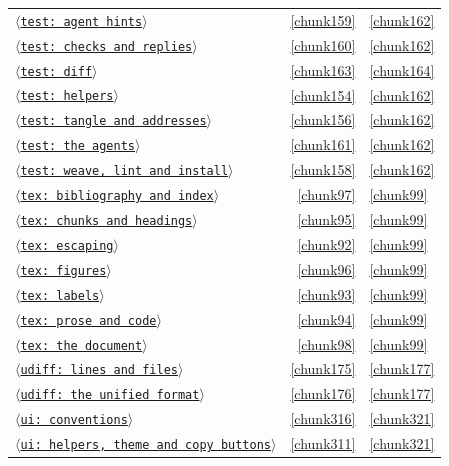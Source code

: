 \documentclass[10pt,a4paper]{article}
\newcounter{chunk}
\newcommand{\chunkname}[1]{\ensuremath{\langle}\texttt{#1}\ensuremath{\rangle}}
\begin{document}
\begin{longtable}{@{}p{}rp{}@{}}
\hyperref[chunk159]{\chunkname{test: agent hints}} & \ref*{chunk159} & \hyperref[chunk162]{\ref*{chunk162}} \\
\hyperref[chunk160]{\chunkname{test: checks and replies}} & \ref*{chunk160} & \hyperref[chunk162]{\ref*{chunk162}} \\
\hyperref[chunk163]{\chunkname{test: diff}} & \ref*{chunk163} & \hyperref[chunk164]{\ref*{chunk164}} \\
\hyperref[chunk154]{\chunkname{test: helpers}} & \ref*{chunk154} & \hyperref[chunk162]{\ref*{chunk162}} \\
\hyperref[chunk156]{\chunkname{test: tangle and addresses}} & \ref*{chunk156} & \hyperref[chunk162]{\ref*{chunk162}} \\
\hyperref[chunk161]{\chunkname{test: the agents}} & \ref*{chunk161} & \hyperref[chunk162]{\ref*{chunk162}} \\
\hyperref[chunk158]{\chunkname{test: weave, lint and install}} & \ref*{chunk158} & \hyperref[chunk162]{\ref*{chunk162}} \\
\hyperref[chunk97]{\chunkname{tex: bibliography and index}} & \ref*{chunk97} & \hyperref[chunk99]{\ref*{chunk99}} \\
\hyperref[chunk95]{\chunkname{tex: chunks and headings}} & \ref*{chunk95} & \hyperref[chunk99]{\ref*{chunk99}} \\
\hyperref[chunk92]{\chunkname{tex: escaping}} & \ref*{chunk92} & \hyperref[chunk99]{\ref*{chunk99}} \\
\hyperref[chunk96]{\chunkname{tex: figures}} & \ref*{chunk96} & \hyperref[chunk99]{\ref*{chunk99}} \\
\hyperref[chunk93]{\chunkname{tex: labels}} & \ref*{chunk93} & \hyperref[chunk99]{\ref*{chunk99}} \\
\hyperref[chunk94]{\chunkname{tex: prose and code}} & \ref*{chunk94} & \hyperref[chunk99]{\ref*{chunk99}} \\
\hyperref[chunk98]{\chunkname{tex: the document}} & \ref*{chunk98} & \hyperref[chunk99]{\ref*{chunk99}} \\
\hyperref[chunk175]{\chunkname{udiff: lines and files}} & \ref*{chunk175} & \hyperref[chunk177]{\ref*{chunk177}} \\
\hyperref[chunk176]{\chunkname{udiff: the unified format}} & \ref*{chunk176} & \hyperref[chunk177]{\ref*{chunk177}} \\
\hyperref[chunk316]{\chunkname{ui: conventions}} & \ref*{chunk316} & \hyperref[chunk321]{\ref*{chunk321}} \\
\hyperref[chunk311]{\chunkname{ui: helpers, theme and copy buttons}} & \ref*{chunk311} & \hyperref[chunk321]{\ref*{chunk321}} \\

\end{longtable}
\end{document}

